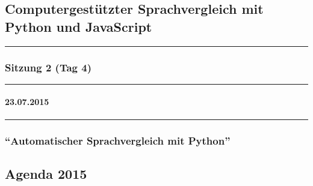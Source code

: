 
\subsection{Computergestützter Sprachvergleich mit Python und
JavaScript}

\begin{center}\rule{0.5\linewidth}{\linethickness}\end{center}

\subsubsection{Sitzung 2 (Tag 4)}

\begin{center}\rule{0.5\linewidth}{\linethickness}\end{center}

\paragraph{23.07.2015}

\begin{center}\rule{0.5\linewidth}{\linethickness}\end{center}

\subsubsection{\texorpdfstring{``Automatischer Sprachvergleich mit
Python''}{Automatischer Sprachvergleich mit Python}}

\subsection{\texorpdfstring{{Agenda 2015}}{Agenda 2015}}

